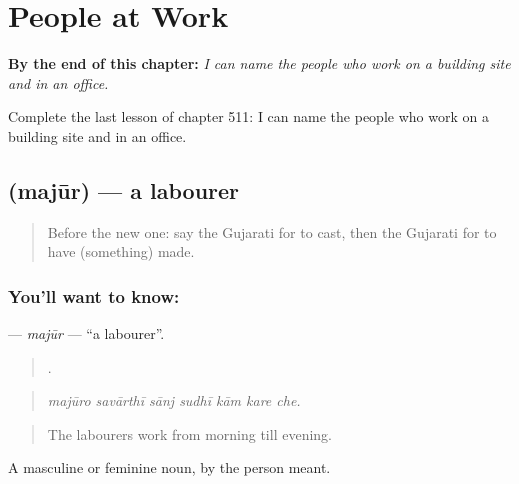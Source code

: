 
\chapter{People at Work}
\label{ch:gu-people-at-work}

\begin{chapteropening}
\textbf{By the end of this chapter:} \emph{I can name the people who work on a building site and in an office.}

Complete the last lesson of chapter 511: I can name the people who work on a building site and in an office.
\end{chapteropening}

\section[\texorpdfstring{\gu{મજૂર} (majūr)}{મજૂર (majūr)}]{ (majūr) — a labourer}

\label{lesson:GU-C511-majur}



\begin{quote}
Before the new one: say the Gujarati for to cast, then the Gujarati for to have (something) made.
\end{quote}

\subsection*{You'll want to know: }
\textbf{} — \emph{majūr} — \textquotedblleft{}a labourer\textquotedblright{}.

\begin{quote}
      .
\end{quote}

\begin{quote}
\emph{majūro savārthī sānj sudhī kām kare che.}
\end{quote}

\begin{quote}
The labourers work from morning till evening.
\end{quote}

A masculine or feminine noun, by the person meant.

